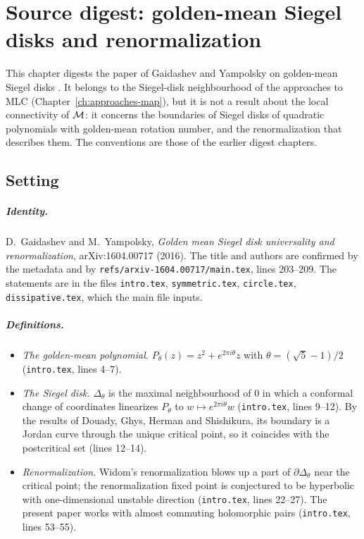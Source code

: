 \chapter[Siegel-disk renormalization]{Source digest: golden-mean Siegel disks and renormalization}
\label{ch:digests-siegel}

This chapter digests the paper of Gaidashev and Yampolsky on golden-mean Siegel disks \cite{GaYaGoldenMean}.  It belongs to
the Siegel-disk neighbourhood of the approaches to MLC (Chapter~\ref{ch:approaches-map}), but it is not a result about the
local connectivity of $\mathcal M$: it concerns the boundaries of Siegel disks of quadratic polynomials with golden-mean rotation
number, and the renormalization that describes them.  The conventions are those of the earlier digest chapters.

\section{Setting}
\label{sec:siegel-setting}

\paragraph{Identity.}
D.~Gaidashev and M.~Yampolsky, \emph{Golden mean Siegel disk universality and renormalization}, arXiv:1604.00717 (2016).  The
title and authors are confirmed by the metadata and by \texttt{refs/arxiv-1604.00717/main.tex}, lines 203--209.  The statements
are in the files \texttt{intro.tex}, \texttt{symmetric.tex}, \texttt{circle.tex}, \texttt{dissipative.tex}, which the main file
inputs.

\paragraph{Definitions.}
\begin{itemize}
\item \emph{The golden-mean polynomial.}  $P_\theta(z)=z^2+e^{2\pi i\theta}z$ with $\theta=(\sqrt5-1)/2$ (\texttt{intro.tex},
lines 4--7).
\item \emph{The Siegel disk.}  $\Delta_\theta$ is the maximal neighbourhood of $0$ in which a conformal change of coordinates
linearizes $P_\theta$ to $w\mapsto e^{2\pi i\theta}w$ (\texttt{intro.tex}, lines 9--12).  By the results of Douady, Ghys, Herman and
Shishikura, its boundary is a Jordan curve through the unique critical point, so it coincides with the postcritical set
(lines 12--14).
\item \emph{Renormalization.}  Widom's renormalization blows up a part of $\partial\Delta_\theta$ near the critical point; the
renormalization fixed point is conjectured to be hyperbolic with one-dimensional unstable direction (\texttt{intro.tex}, lines
22--27).  The present paper works with almost commuting holomorphic pairs (\texttt{intro.tex}, lines 53--55).
\end{itemize}

